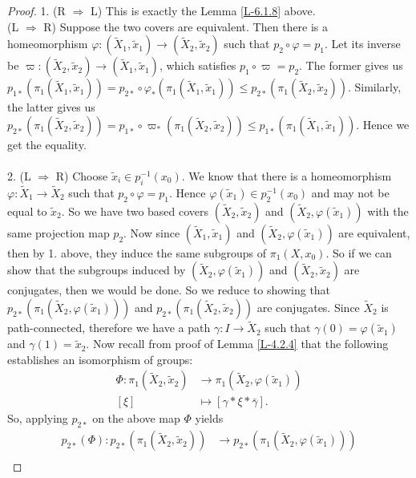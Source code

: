 \documentclass[letterpaper,11pt,twoside]{article}
\theoremstyle{definition}
\theoremstyle{definition}
\theoremstyle{definition}
\theoremstyle{definition}
\theoremstyle{definition}
\theoremstyle{definition}
\theoremstyle{remark}
\theoremstyle{definition}
\begin{document}
\begin{proof}
	1. (R $ \Rightarrow $ L) This is exactly the Lemma \ref{L-6.1.8} above. \\
	(L $ \Rightarrow $ R) Suppose the two covers are equivalent. Then there is a homeomorphism $ \varphi: (\tilde{X}_1,\tilde{x}_1)  \to (\tilde{X}_2,\tilde{x}_2)$ such that $ p_2\circ \varphi = p_1 $. Let its inverse be $ \varpi : (\tilde{X}_2,\tilde{x}_2)  \to (\tilde{X}_1,\tilde{x}_1) $, which satisfies $ p_1\circ \varpi = p_2 $. The former gives us $ p_{1*}(\pi_1(\tilde{X}_1,\tilde{x}_1)) = p_{2*}\circ \varphi_{*}(\pi_1(\tilde{X}_1,\tilde{x}_1)) \le p_{2*}(\pi_1(\tilde{X}_2,\tilde{x}_2))$. Similarly, the latter gives us $ p_{2*}(\pi_1(\tilde{X}_2,\tilde{x}_2))  = p_{1*}\circ \varpi_{*}(\pi_1(\tilde{X}_2,\tilde{x}_2)) \le p_{1*}(\pi_1(\tilde{X}_1,\tilde{x}_1))$. Hence we get the equality.\\\\
	2. (L $ \Rightarrow $ R) Choose $ \tilde{x}_i \in p_{i}^{-1}(x_0)$. We know that there is a homeomorphism $ \varphi : \tilde{X}_1 \to \tilde{X}_2 $ such that $ p_2\circ \varphi =p_1 $. Hence $ \varphi(\tilde{x}_1) \in p_{2}^{-1}(x_0) $ and may not be equal to $ \tilde{x}_2 $. So we have two based covers $ (\tilde{X}_2,\tilde{x}_2) $ and $ (\tilde{X}_2,\varphi(\tilde{x}_1)) $ with the same projection map $ p_2 $. Now since $ (\tilde{X}_1,\tilde{x}_1) $ and $ (\tilde{X}_2,\varphi(\tilde{x}_1)) $ are equivalent, then by 1. above, they induce the same subgroups of $ \pi_1(X,x_0) $. So if we can show that the subgroups induced by $ (\tilde{X}_2,\varphi(\tilde{x}_1)) $ and $ (\tilde{X}_2,\tilde{x}_2) $ are conjugates, then we would be done. So we reduce to showing that $ p_{2*}(\pi_1(\tilde{X}_2,\varphi(\tilde{x}_1))) $ and $p_{2*} (\pi_1(\tilde{X}_2,\tilde{x}_2)) $ are conjugates. Since $ \tilde{X}_2 $ is path-connected, therefore we have a path $ \gamma : I\to \tilde{X}_2 $ such that $ \gamma(0) = \varphi(\tilde{x}_1) $ and $ \gamma(1) = \tilde{x}_2 $. Now recall from proof of Lemma \ref{L-4.2.4} that the following establishes an isomorphism of groups:
	\begin{align*}
		\Phi: \pi_1(\tilde{X}_2,\tilde{x}_2)&\longrightarrow \pi_1(\tilde{X}_2,\varphi(\tilde{x}_1))\\
		[\xi] &\longmapsto [\gamma * \xi * \bar{\gamma}].
	\end{align*}
	So, applying $ p_{2*} $ on the above map $ \Phi $ yields
	\begin{align*}
		p_{2*}(\Phi) : p_{2*} (\pi_1(\tilde{X}_2,\tilde{x}_2))  &\longrightarrow  p_{2*}(\pi_1(\tilde{X}_2,\varphi(\tilde{x}_1)))\\

\end{align*}
\end{proof}
\end{document}
